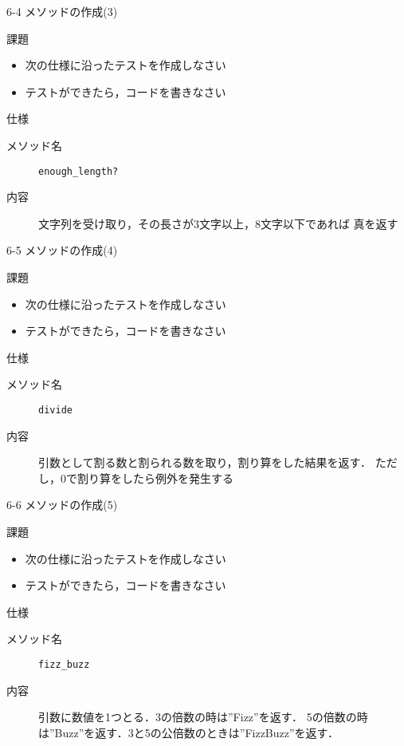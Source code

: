 \documentclass[t, aspectratio=169]{beamer}
\begin{document}
\begin{frame}[fragile,label=sec-6-4-4]{6-4 メソッドの作成(3)}
 \begin{block}{課題}
\begin{itemize}
\item 次の仕様に沿ったテストを作成しなさい
\item テストができたら，コードを書きなさい
\end{itemize}
\end{block}
\begin{block}{仕様}
\begin{description}
\item[{メソッド名}] \texttt{enough\_length?}
\item[{内容}] 文字列を受け取り，その長さが3文字以上，8文字以下であれば
真を返す
\end{description}
\end{block}
\end{frame}

\begin{frame}[fragile,label=sec-6-4-5]{6-5 メソッドの作成(4)}
 \begin{block}{課題}
\begin{itemize}
\item 次の仕様に沿ったテストを作成しなさい
\item テストができたら，コードを書きなさい
\end{itemize}
\end{block}
\begin{block}{仕様}
\begin{description}
\item[{メソッド名}] \texttt{divide}
\item[{内容}] 引数として割る数と割られる数を取り，割り算をした結果を返す．
ただし，0で割り算をしたら例外を発生する
\end{description}
\end{block}
\end{frame}

\begin{frame}[fragile,label=sec-6-4-6]{6-6 メソッドの作成(5)}
 \begin{block}{課題}
\begin{itemize}
\item 次の仕様に沿ったテストを作成しなさい
\item テストができたら，コードを書きなさい
\end{itemize}
\end{block}
\begin{block}{仕様}
\begin{description}
\item[{メソッド名}] \texttt{fizz\_buzz}
\item[{内容}] 引数に数値を1つとる．3の倍数の時は”Fizz”を返す．
5の倍数の時は”Buzz”を返す．3と5の公倍数のときは”FizzBuzz”を返す．
\end{description}
\end{block}
\end{frame}
\end{document}
